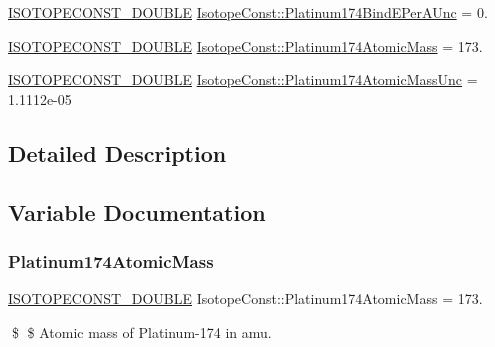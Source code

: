 \begin{DoxyCompactItemize}
\mbox{\hyperlink{group___isotope_const-_macros_ga8f45a7272ce02c0b4c65c44636ed719a}{I\+S\+O\+T\+O\+P\+E\+C\+O\+N\+S\+T\+\_\+\+D\+O\+U\+B\+LE}} \mbox{\hyperlink{group___isotope_const-_platinum-_pt174_ga64b9f3a38d856dc9384be66685902b6b}{Isotope\+Const\+::\+Platinum174\+Bind\+E\+Per\+A\+Unc}} = 0.
\item 
\mbox{\hyperlink{group___isotope_const-_macros_ga8f45a7272ce02c0b4c65c44636ed719a}{I\+S\+O\+T\+O\+P\+E\+C\+O\+N\+S\+T\+\_\+\+D\+O\+U\+B\+LE}} \mbox{\hyperlink{group___isotope_const-_platinum-_pt174_gaebdfdde735908f5baf8354bc58c6c1ef}{Isotope\+Const\+::\+Platinum174\+Atomic\+Mass}} = 173.
\item 
\mbox{\hyperlink{group___isotope_const-_macros_ga8f45a7272ce02c0b4c65c44636ed719a}{I\+S\+O\+T\+O\+P\+E\+C\+O\+N\+S\+T\+\_\+\+D\+O\+U\+B\+LE}} \mbox{\hyperlink{group___isotope_const-_platinum-_pt174_ga2c350bc1c3eaadc70f1344e61c05b06a}{Isotope\+Const\+::\+Platinum174\+Atomic\+Mass\+Unc}} = 1.\+1112e-\/05
\end{DoxyCompactItemize}


\subsection{Detailed Description}


\subsection{Variable Documentation}
\mbox{\label{group___isotope_const-_platinum-_pt174_gaebdfdde735908f5baf8354bc58c6c1ef}} 
\subsubsection{\texorpdfstring{Platinum174\+Atomic\+Mass}{Platinum174AtomicMass}}
{\footnotesize\ttfamily \mbox{\hyperlink{group___isotope_const-_macros_ga8f45a7272ce02c0b4c65c44636ed719a}{I\+S\+O\+T\+O\+P\+E\+C\+O\+N\+S\+T\+\_\+\+D\+O\+U\+B\+LE}} Isotope\+Const\+::\+Platinum174\+Atomic\+Mass = 173.}

\$ \$ Atomic mass of Platinum-\/174 in amu. \mbox{\label{group___isotope_const-_platinum-_pt174_ga2c350bc1c3eaadc70f1344e61c05b06a}} 

